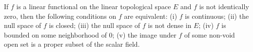 If $f$ is a linear functional on the linear topological space $E$ and $f$ is not identically zero, then the following conditions on $f$ are equivalent: (i) $f$ is continuous; (ii) the null space of $f$ is closed; (iii) the null space of $f$ is not dense in $E$; (iv) $f$ is bounded on some neighborhood of $0$; (v) the image under $f$ of some non-void open set is a proper subset of the scalar field.
